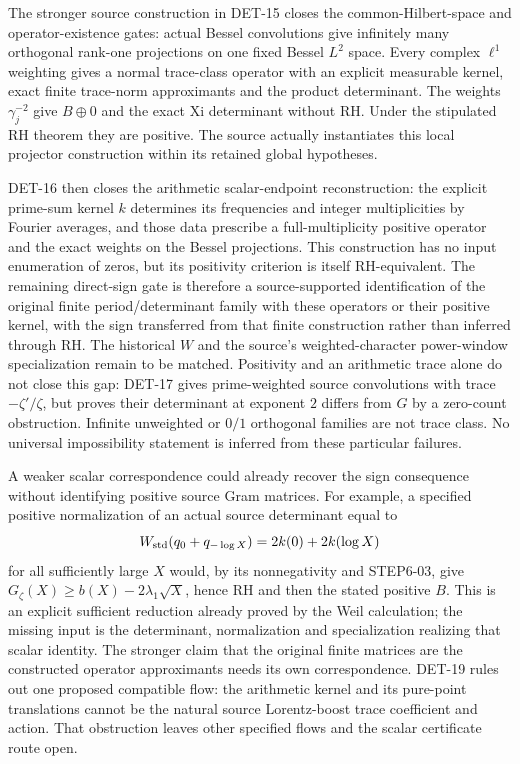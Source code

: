 \documentclass[11pt,a4paper]{article}
\newcommand{\fid}[1]{\textsf{#1}}
\begin{document}
The stronger source construction in \fid{DET-15} closes the common-Hilbert-space and operator-existence gates: actual Bessel convolutions give infinitely many orthogonal rank-one projections on one fixed Bessel $L^2$ space. Every complex $\ell^1$ weighting gives a normal trace-class operator with an explicit measurable kernel, exact finite trace-norm approximants and the product determinant. The weights $\gamma_j^{-2}$ give $B\oplus0$ and the exact Xi determinant without RH. Under the stipulated RH theorem they are positive. The source actually instantiates this local projector construction within its retained global hypotheses.

\fid{DET-16} then closes the arithmetic scalar-endpoint reconstruction: the explicit prime-sum kernel $k$ determines its frequencies and integer multiplicities by Fourier averages, and those data prescribe a full-multiplicity positive operator and the exact weights on the Bessel projections. This construction has no input enumeration of zeros, but its positivity criterion is itself RH-equivalent. The remaining direct-sign gate is therefore a source-supported identification of the original finite period/determinant family with these operators or their positive kernel, with the sign transferred from that finite construction rather than inferred through RH. The historical $W$ and the source's weighted-character power-window specialization remain to be matched. Positivity and an arithmetic trace alone do not close this gap: \fid{DET-17} gives prime-weighted source convolutions with trace $-\zeta'/\zeta$, but proves their determinant at exponent $2$ differs from $G$ by a zero-count obstruction. Infinite unweighted or $0/1$ orthogonal families are not trace class. No universal impossibility statement is inferred from these particular failures.

A weaker scalar correspondence could already recover the sign consequence without identifying positive source Gram matrices. For example, a specified positive normalization of an actual source determinant equal to
\[
 W_{\rm std}(q_0+q_{-\log X})=2k(0)+2k(\log X)
\]
for all sufficiently large $X$ would, by its nonnegativity and \fid{STEP6-03}, give
$G_\zeta(X)\ge b(X)-2\lambda_1\sqrt X$, hence RH and then the stated positive $B$. This is an explicit sufficient reduction already proved by the Weil calculation; the missing input is the determinant, normalization and specialization realizing that scalar identity. The stronger claim that the original finite matrices are the constructed operator approximants needs its own correspondence. \fid{DET-19} rules out one proposed compatible flow: the arithmetic kernel and its pure-point translations cannot be the natural source Lorentz-boost trace coefficient and action. That obstruction leaves other specified flows and the scalar certificate route open.
\end{document}
